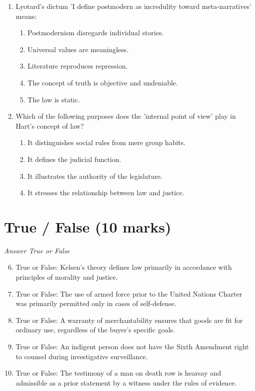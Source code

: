 \documentclass[12pt]{article}
\begin{document}
\begin{enumerate}[label=\arabic*.]
\begin{enumerate}[label=(\alph*)]
    \item 'Men are more inclined towards justice, while women tend to focus on fairness.'
    \item There are fundamental differences between individual women.'
\end{enumerate}
\item Lyotard's dictum 'I define postmodern as incredulity toward meta-narratives' means:
\begin{enumerate}[label=(\alph*)]
    \item Postmodernism disregards individual stories.
    \item Universal values are meaningless.
    \item Literature reproduces repression.
    \item The concept of truth is objective and undeniable.
    \item The law is static.
\end{enumerate}
\item Which of the following purposes does the 'internal point of view' play in Hart's concept of law?
\begin{enumerate}[label=(\alph*)]
    \item It distinguishes social rules from mere group habits.
    \item It defines the judicial function.
    \item It illustrates the authority of the legislature.
    \item It stresses the relationship between law and justice.
\end{enumerate}
\end{enumerate}

\section*{True / False (10 marks)}
\textit{Answer True or False}
\begin{enumerate}[label=\arabic*.]
\setcounter{enumi}{5}
\item True or False: Kelsen's theory defines law primarily in accordance with principles of morality and justice.
\item True or False: The use of armed force prior to the United Nations Charter was primarily permitted only in cases of self-defense.
\item True or False: A warranty of merchantability ensures that goods are fit for ordinary use, regardless of the buyer's specific goals.
\item True or False: An indigent person does not have the Sixth Amendment right to counsel during investigative surveillance.
\item True or False: The testimony of a man on death row is hearsay and admissible as a prior statement by a witness under the rules of evidence.
\end{enumerate}
\end{document}
